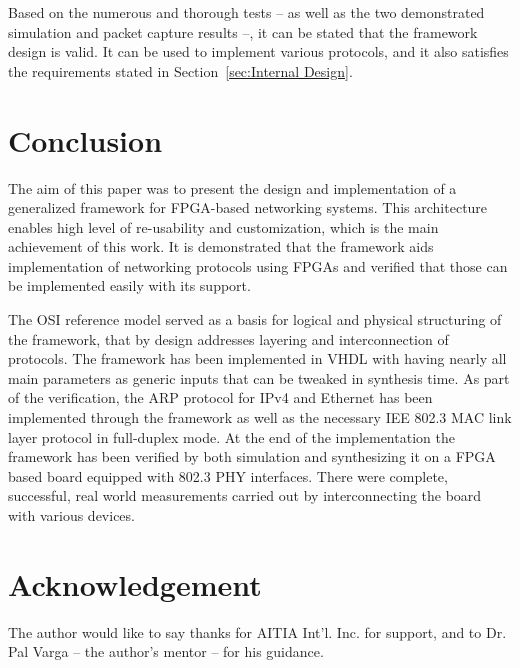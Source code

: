\documentclass[journal]{IEEEtran}
\begin{document}
Based on the numerous and thorough tests -- as well as the two demonstrated simulation and packet capture results --,
it can be stated that the framework design is valid. It can be used to implement various protocols, and it also
satisfies the requirements stated in Section~\ref{sec:Internal Design}.

\section{Conclusion}

The aim of this paper was to present the design and implementation of a generalized framework for FPGA-based networking
systems. This architecture enables high level of re-usability and customization, which is the main achievement of this
work. It is demonstrated that the framework aids implementation of networking protocols using FPGAs and verified that
those can be implemented easily with its support.

The OSI reference model served as a basis for logical and physical structuring of the framework, that by design
addresses layering and interconnection of protocols. The framework has been implemented in VHDL with having nearly all
main parameters as generic inputs that can be tweaked in synthesis time. As part of the verification, the ARP protocol
for
IPv4 and Ethernet has been implemented through the framework as well as the  necessary IEE 802.3 MAC link layer
protocol in full-duplex mode.
At the end of the implementation the framework has been verified by both simulation and synthesizing it on a FPGA based
board equipped with 802.3 PHY interfaces. There were complete,	successful, real world measurements carried out by
interconnecting the board with various devices.

\section*{Acknowledgement}
The author would like to say thanks for AITIA Int’l. Inc. for support, and to Dr. Pal Varga -- the author's mentor --
for his guidance.





%

%
%
\end{document}

